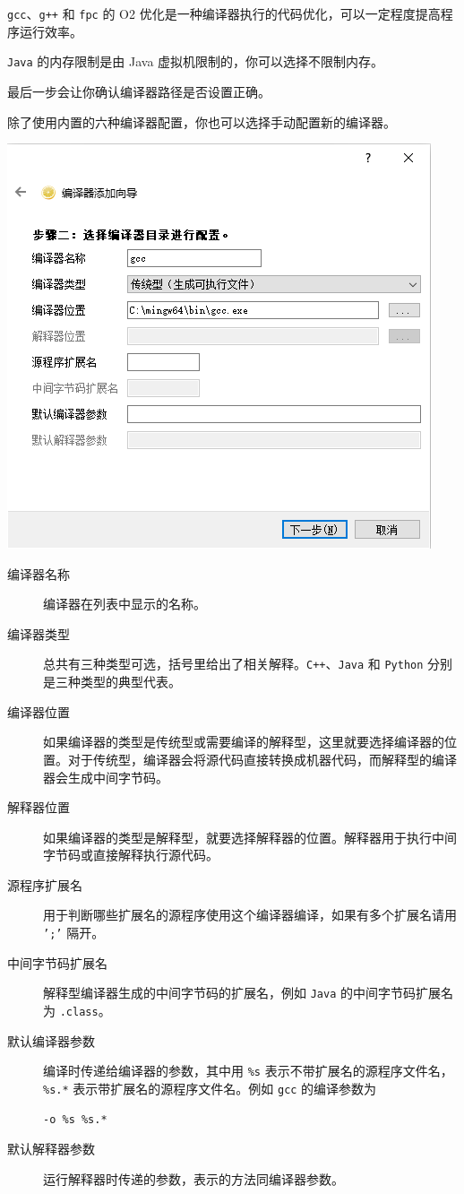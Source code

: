 \documentclass[12pt, a4paper]{article}
\begin{document}
\texttt{gcc}、\texttt{g++} 和 \texttt{fpc} 的 O2 优化是一种编译器执行的代码优化，可以一定程度提高程序运行效率。

\texttt{Java} 的内存限制是由 Java 虚拟机限制的，你可以选择不限制内存。

最后一步会让你确认编译器路径是否设置正确。

除了使用内置的六种编译器配置，你也可以选择手动配置新的编译器。

\begin{center}
\includegraphics[scale=0.6]{pic/addcompiler2.png}
\end{center}

\begin{description}
\item[编译器名称] 编译器在列表中显示的名称。
\item[编译器类型] 总共有三种类型可选，括号里给出了相关解释。\texttt{C++}、\texttt{Java} 和 \texttt{Python} 分别是三种类型的典型代表。
\item[编译器位置] 如果编译器的类型是传统型或需要编译的解释型，这里就要选择编译器的位置。对于传统型，编译器会将源代码直接转换成机器代码，而解释型的编译器会生成中间字节码。
\item[解释器位置] 如果编译器的类型是解释型，就要选择解释器的位置。解释器用于执行中间字节码或直接解释执行源代码。
\item[源程序扩展名] 用于判断哪些扩展名的源程序使用这个编译器编译，如果有多个扩展名请用 \texttt{';'} 隔开。
\item[中间字节码扩展名] 解释型编译器生成的中间字节码的扩展名，例如 \texttt{Java} 的中间字节码扩展名为 \texttt{.class}。
\item[默认编译器参数] 编译时传递给编译器的参数，其中用 \texttt{\%s} 表示不带扩展名的源程序文件名，\texttt{\%s.*} 表示带扩展名的源程序文件名。例如 \texttt{gcc} 的编译参数为
\begin{lstlisting}[frame=shadowbox,basicstyle=\ttfamily]
-o %s %s.*
\end{lstlisting}
\item[默认解释器参数] 运行解释器时传递的参数，表示的方法同编译器参数。
\end{description}
\end{document}
